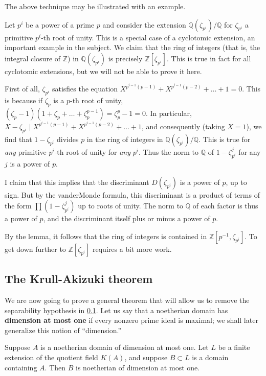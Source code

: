 The above technique may be illustrated with an example.
\begin{example} Let $p^i$ be a power of a prime $p$ and consider the extension
$\mathbb{Q}(\zeta_{p^i})/\mathbb{Q}$ for $\zeta_{p^i}$ a primitive $p^i$-th
root of unity.  This is a special case of a cyclotomic extension, an important
example in the subject.  We claim that the ring of integers (that is, the
integral closure of $\mathbb{Z}$)
in $\mathbb{Q}(\zeta_{p^i})$ is precisely $\mathbb{Z}[\zeta_{p^i}]$.  This is true in fact for all cyclotomic extensions, but we will not be able to prove it here.

First of all, $\zeta_{p^i}$ satisfies the equation $X^{p^{i-1}(p-1)} +
X^{p^{i-1}(p-2)} + \dots + 1 = 0$.  This is because if $\zeta_p$ is a $p$-th
root of unity, $(\zeta_p-1)(1+\zeta_p + \dots + \zeta_p^{p-1}) = \zeta_p^p - 1 =
0$.  In particular, $X - \zeta_{p^i} \mid X^{p^{i-1}(p-1)} +
X^{p^{i-1}(p-2)} + \dots + 1 $, and consequently (taking $X=1$), we find that
$1 - \zeta_{p^i}$ divides $p$ in the ring of integers in
$\mathbb{Q}(\zeta_{p^i})/\mathbb{Q}$.  This is true for \emph{any} primitive
$p^i$-th root of unity for \emph{any} $p^i$.  Thus the norm to $\mathbb{Q}$ of $1 - \zeta_{p^i}^j$ for any $j$ is a power of $p$.

I claim that this implies that the discriminant $D(\zeta_{p^i})$ is a power of
$p$, up to sign. But by the vanderMonde formula, this discriminant is a
product of terms of the form $\prod (1 - \zeta_{p^i}^{j})$ up to roots of
unity.  The norm to $\mathbb{Q}$ of each factor is thus a power of $p$, and the discriminant itself plus or minus a power of $p$.

By the lemma, it follows that the ring of integers is contained in
$\mathbb{Z}[p^{-1}, \zeta_{p^i}]$. To get down further to
$\mathbb{Z}[\zeta_{p^i}]$ requires a bit more work. 
\end{example}


\subsection{The Krull-Akizuki theorem}

We are now going to prove a general theorem that will allow us to remove the
separability hypothesis in \cref{}. Let us say that a noetherian domain has
\textbf{dimension at most one} if every nonzero prime ideal is maximal; we shall later
generalize this notion of ``dimension.''

\begin{theorem} Suppose $A$ is a noetherian domain of dimension
at most one. Let $L$ be a finite extension of the quotient field $K(A)$, and suppose
$B \subset L$ is a domain containing $A$. Then $B$ is noetherian of  dimension
at most one.
\end{theorem} 


